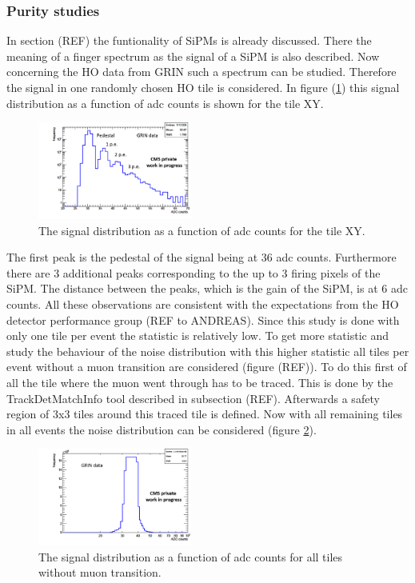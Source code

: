 		\subsubsection{Purity studies}
			In section (REF) the funtionality of SiPMs is already discussed.
			There the meaning of a finger spectrum as the signal of a SiPM is also described.
			Now concerning the HO data from GRIN such a spectrum can be studied.
			Therefore the signal in one randomly chosen HO tile is considered.
			In figure (\ref{fig:noise_low}) this signal distribution as a function of adc counts is shown for the tile XY.
			\begin{figure}[htbp]
				\centering
				\includegraphics[width=0.45\textwidth]{Figures/erdogan/noise_low.png}
				\caption{The signal distribution as a function of adc counts for the tile XY.}
				\label{fig:noise_low}
			\end{figure}
			The first peak is the pedestal of the signal being at 36 adc counts.
			Furthermore there are 3 additional peaks corresponding to the up to 3 firing pixels of the SiPM.
			The distance between the peaks, which is the gain of the SiPM, is at 6 adc counts.
			All these observations are consistent with the expectations from the HO detector performance group (REF to ANDREAS).
			Since this study is done with only one tile per event the statistic is relatively low.
			To get more statistic and study the behaviour of the noise distribution with this higher statistic all tiles per event without a muon transition are considered (figure (REF)).
			To do this first of all the tile where the muon went through has to be traced.
			This is done by the TrackDetMatchInfo tool described in subsection (REF).
			Afterwards a safety region of 3x3 tiles around this traced tile is defined.
			Now with all remaining tiles in all events the noise distribution can be considered (figure \ref{fig:noise_high}).
			\begin{figure}[htbp]
				\centering
				\includegraphics[width=0.45\textwidth]{Figures/erdogan/noise_high.png}
				\caption{The signal distribution as a function of adc counts for all tiles without muon transition.}
				\label{fig:noise_high}
			\end{figure}

